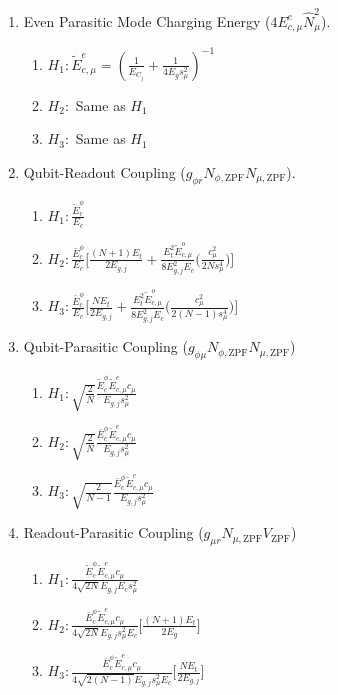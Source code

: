 \documentclass[%
reprint,
superscriptaddress,
 amsmath,amssymb,
 aps,
 prx,
longbibliography,
floatfix,
]{revtex4-2}
\begin{document}
\begin{enumerate}
\item Even Parasitic Mode Charging Energy  ($4E_{c,\mu}^e \hat N_{\mu}^2$). 
    \begin{enumerate}
    \item $H_1: \tilde{E}_{c,\mu}^{e}=(\frac{1}{E_{C_j}}+\frac{1}{4E_gs_\mu^2})^{-1}$ 
    \item $H_2:$ Same as $H_1$
    \item $H_3:$ Same as $H_1$
\end{enumerate}
     \item Qubit-Readout Coupling ($g_{\phi r}N_{\phi,\mathrm{ZPF}}N_{\mu,\mathrm{ZPF}}$).
    \begin{enumerate}
        \item $H_1: \frac{\tilde{E}_c^\phi}{E_c}$
        \item $H_2:\frac{\bar{E}_c^\phi}{E_c} \Big[\frac{(N+1)E_t}{2E_{g,j}}+\frac{E_t^2\tilde{E}_{c,\mu}^o}{8E_{g,j}^2E_c} \Big(\frac{c_\mu^2}{2Ns_\mu^4}\Big)\Big]$
        \item $H_3:\frac{\bar{E}_c^\phi}{E_c} \Big[\frac{NE_t}{2E_{g,j}}+\frac{E_t^2\tilde{E}_{c,\mu}^o}{8E_{g,j}^2E_c} \Big(\frac{c_\mu^2}{2(N-1)s_\mu^4}\Big)\Big]$
    \end{enumerate}
\item Qubit-Parasitic Coupling ($g_{\phi\mu}N_{\phi,\mathrm{ZPF}}N_{\mu,\mathrm{ZPF}}$)    
    \begin{enumerate}
        \item $H_1: \sqrt{\frac{2}{N}} \frac{\tilde{E}^\phi_c\tilde{E}^e_{c,\mu}c_\mu}{E_{g,j}s_\mu^2}$
        \item $H_2:\sqrt{\frac{2}{N}} \frac{\bar{E}^\phi_c\tilde{E}^{e}_{c,\mu}c_\mu}{E_{g,j}s_\mu^2}$
        \item $H_3:\sqrt{\frac{2}{N-1}} \frac{\bar{E}^\phi_c\tilde{E}^{e}_{c,\mu}c_\mu}{E_{g,j}s_\mu^2}$
    \end{enumerate}

\item Readout-Parasitic Coupling ($g_{\mu r}N_{\mu,\mathrm{ZPF}} V_{\mathrm{ZPF}}$)
    \begin{enumerate}
        \item $H_1: \frac{\tilde{E}^\phi_c\tilde{E}^e_{c,\mu}c_\mu}{4\sqrt{2N}E_{g,j}E_cs_\mu^2}$
        \item $H_2:\frac{\bar{E}^\phi_c\tilde{E}^{e}_{c,\mu}c_\mu }{4\sqrt{2N}E_{g,j}s_\mu^2E_c}\Big[\frac{(N+1)E_t}{2E_g} \Big]$
        \item $H_3:\frac{\bar{E}^\phi_c\tilde{E}^{e}_{c,\mu}c_\mu }{4\sqrt{2(N-1)}E_{g,j}s_\mu^2E_c}\Big[\frac{NE_t}{2E_{g,j}} \Big]$
    \end{enumerate}
   
\end{enumerate}
\end{document}
